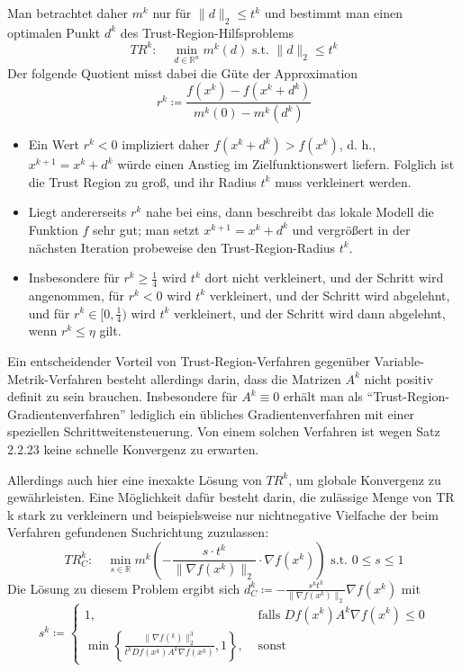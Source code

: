 \documentclass[11pt]{scrreprt}
\theoremstyle{thmstyle}
\numberwithin{thm}{section}
\begin{document}
Man betrachtet daher $m^k$ nur für $\| d \|_2 \leq t^k$ und bestimmt man einen optimalen Punkt $d^k$ des Trust-Region-Hilfsproblems
$$ TR^k: \quad \min_{d \in \mathbb{R}^n} m^k(d) \text{ s.t. } \| d \|_2 \leq t^k $$
Der folgende Quotient misst dabei die Güte der Approximation
$$ r^k \coloneqq \frac{f(x^k) - f(x^k + d^k)}{m^k(0)- m^k(d^k)} $$

\begin{itemize}
	\item Ein Wert $r^k < 0$ impliziert daher $f (x^k + d^k) > f (x^k)$, d. h., $x^{k+1} = x^k + d^k$ würde einen Anstieg im Zielfunktionswert liefern. Folglich ist die Trust Region zu groß, und ihr Radius $t^k$ muss verkleinert werden.
	\item Liegt andererseits $r^k$ nahe bei eins, dann beschreibt das lokale Modell die Funktion $f$ sehr gut; man setzt $x^{k+1} = x^k + d^k$ und vergrößert in der nächsten Iteration probeweise den Trust-Region-Radius $t^k$.
	\item Insbesondere für $r^k \geq \frac{1}{4}$ wird $t^k$ dort nicht verkleinert, und der Schritt wird angenommen, für $r^k < 0$ wird $t^k$ verkleinert, und der Schritt wird abgelehnt, und für $r^k \in [0, \frac{1}{4})$ wird $t^k$ verkleinert, und der Schritt wird dann abgelehnt, wenn $r^k \leq \eta$ gilt.
\end{itemize}

Ein entscheidender Vorteil von Trust-Region-Verfahren gegenüber Variable-Metrik-Verfahren besteht allerdings darin, dass die Matrizen $A^k$ nicht positiv definit zu sein brauchen. Insbesondere für $A^k \equiv 0$ erhält man als \enquote{Trust-Region-Gradientenverfahren} lediglich ein übliches Gradientenverfahren mit einer speziellen Schrittweitensteuerung. Von einem solchen Verfahren ist wegen Satz 2.2.23 keine schnelle Konvergenz zu erwarten. ~\bigskip

 Allerdings auch hier eine inexakte Lösung von $TR^k$, um globale Konvergenz zu gewährleisten. Eine Möglichkeit dafür besteht darin, die zulässige Menge von TR k stark zu verkleinern und beispielsweise nur nichtnegative Vielfache der beim Verfahren gefundenen Suchrichtung zuzulassen:
$$ TR_C^k: \quad \min_{s \in \mathbb{R}} m^k \left( - \frac{s \cdot t^k}{\| \nabla f(x^k) \|_2} \cdot \nabla f(x^k) \right) \text{ s.t. } 0 \leq s \leq 1 $$
Die Lösung zu diesem Problem ergibt sich $d_C^k \coloneqq - \frac{s^k t^k}{\| \nabla f(x^k) \|_2} \nabla f(x^k)$ mit
$$ s^k \coloneqq \begin{cases} 1, & \text{ falls } Df(x^k) A^k \nabla f(x^k)\leq 0 \\ \min \left\{ \frac{\| \nabla f(^k) \|_2^3}{t^k Df(x^k) A^k \nabla f(x^k)}, 1 \right\}, & \text{ sonst} \end{cases} $$
\end{document}
